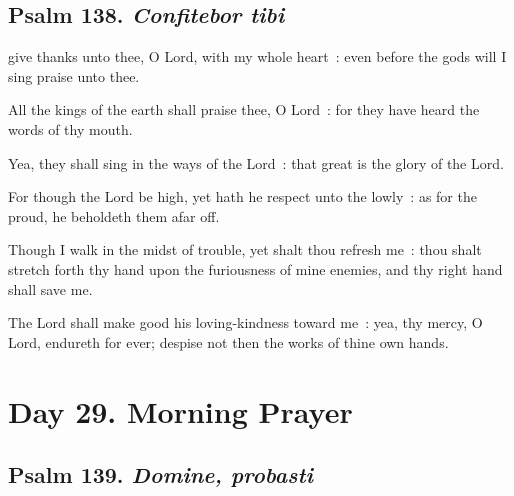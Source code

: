 \subsection{Psalm 138. \textit{Confitebor tibi}}


 give thanks unto thee, O Lord, with my whole heart~: even before the gods will I sing praise unto thee.\par
{}
All the kings of the earth shall praise thee, O Lord~: for they have heard the words of thy mouth.\par
{}Yea, they shall sing in the ways of the Lord~: that great is the glory of the Lord.\par
{}For though the Lord be high, yet hath he respect unto the lowly~: as for the proud, he beholdeth them afar off.\par
{}Though I walk in the midst of trouble, yet shalt thou refresh me~: thou shalt stretch forth thy hand upon the furiousness of mine enemies, and thy right hand shall save me.\par
{}The Lord shall make good his loving-kindness toward me~: yea, thy mercy, O Lord, endureth for ever; despise not then the works of thine own hands.\par


\section*{Day 29. Morning Prayer}


\subsection{Psalm 139. \textit{Domine, probasti}}


